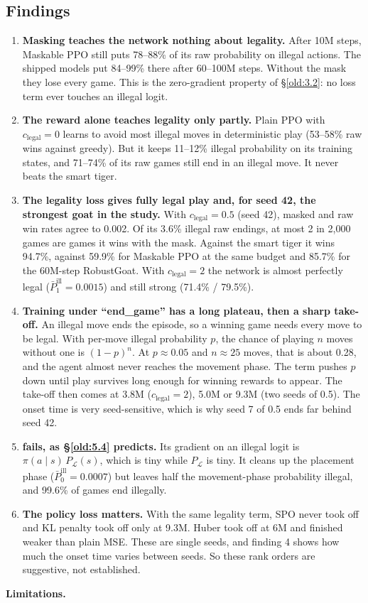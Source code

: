 \subsection{Findings}\label{old:9.3}

\begin{enumerate}
\item \textbf{Masking teaches the network nothing about legality.} After 10M steps, Maskable PPO still puts 78–88\% of its raw probability on illegal actions. The shipped models put 84–99\% there after 60–100M steps. Without the mask they lose every game. This is the zero-gradient property of \S\ref{old:3.2}: no loss term ever touches an illegal logit.
\item \textbf{The reward alone teaches legality only partly.} Plain PPO with $c_{\text{legal}} = 0$ learns to avoid most illegal moves in deterministic play (53–58\% raw wins against greedy). But it keeps 11–12\% illegal probability on its training states, and 71–74\% of its raw games still end in an illegal move. It never beats the smart tiger.
\item \textbf{The  legality loss gives fully legal play and, for seed 42, the strongest goat in the study.} With $c_{\text{legal}} = 0.5$ (seed 42), masked and raw win rates agree to 0.002. Of its 3.6\% illegal raw endings, at most 2 in 2,000 games are games it wins with the mask. Against the smart tiger it wins 94.7\%, against 59.9\% for Maskable PPO at the same budget and 85.7\% for the 60M-step RobustGoat. With $c_{\text{legal}} = 2$ the network is almost perfectly legal ($\bar P^{\text{ill}}_1 = 0.0015$) and still strong (71.4\% / 79.5\%).
\item \textbf{Training under ``end\_game'' has a long plateau, then a sharp take-off.} An illegal move ends the episode, so a winning game needs every move to be legal. With per-move illegal probability $p$, the chance of playing $n$ moves without one is $(1-p)^n$. At $p \approx 0.05$ and $n \approx 25$ moves, that is about 0.28, and the agent almost never reaches the movement phase. The  term pushes $p$ down until play survives long enough for winning rewards to appear. The take-off then comes at 3.8M ($c_{\text{legal}} = 2$), 5.0M or 9.3M (two seeds of 0.5). The onset time is very seed-sensitive, which is why seed 7 of  0.5 ends far behind seed 42.
\item \textbf{ fails, as \S\ref{old:5.4} predicts.} Its gradient on an illegal logit is $\pi(a \mid s)\,P_{\mathcal{L}}(s)$, which is tiny while $P_{\mathcal{L}}$ is tiny. It cleans up the placement phase ($\bar P^{\text{ill}}_0 = 0.0007$) but leaves half the movement-phase probability illegal, and 99.6\% of games end illegally.
\item \textbf{The policy loss matters.} With the same legality term, SPO never took off and KL penalty took off only at 9.3M. Huber took off at 6M and finished weaker than plain MSE. These are single seeds, and finding 4 shows how much the onset time varies between seeds. So these rank orders are suggestive, not established.
\end{enumerate}
\textbf{Limitations.}

